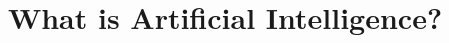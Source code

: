\documentclass[xcolor=dvipsnames,compress,t,pdf,notes,9pt]{beamer}
\title[\insertframenumber /\inserttotalframenumber]{What is Artificial Intelligence?}
\begin{document}
	\begin{frame}
	\titlepage
	\end{frame}

	
	
\end{document}
